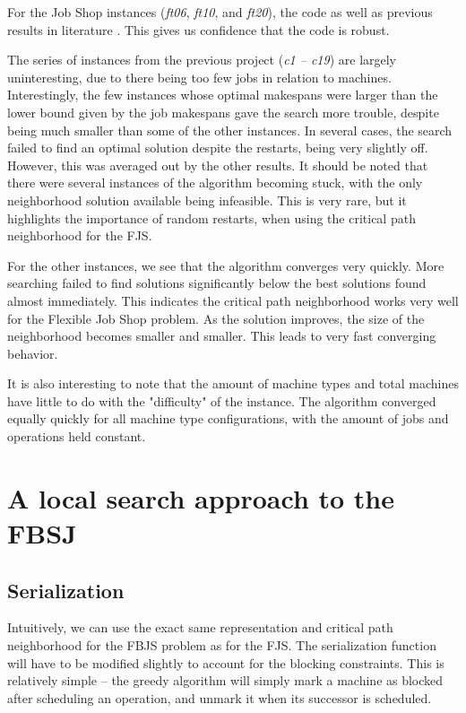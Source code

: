 \documentclass[a4paper,10pt]{article}
\begin{document}
For the Job Shop instances (\emph{ft06}, \emph{ft10}, and \emph{ft20}), the code as well as previous results in literature \cite{simulatedannealingjsp}. This gives us confidence that the code is robust.

The series of instances from the previous project (\emph{c1 -- c19}) are largely uninteresting, due to there being too few jobs in relation to machines. Interestingly, the few instances whose optimal makespans were larger than the lower bound given by the job makespans gave the search more trouble, despite being much smaller than some of the other instances. In several cases, the search failed to find an optimal solution despite the restarts, being very slightly off. However, this was averaged out by the other results. It should be noted that there were several instances of the algorithm becoming stuck, with the only neighborhood solution available being infeasible. This is very rare, but it highlights the importance of random restarts, when using the critical path neighborhood for the FJS.

For the other instances, we see that the algorithm converges very quickly. More searching failed to find solutions significantly below the best solutions found almost immediately. This indicates the critical path neighborhood works very well for the Flexible Job Shop problem. As the solution improves, the size of the neighborhood becomes smaller and smaller. This leads to very fast converging behavior.

It is also interesting to note that the amount of machine types and total machines have little to do with the "difficulty" of the instance. The algorithm converged equally quickly for all machine type configurations, with the amount of jobs and operations held constant.

\section{A local search approach to the FBSJ}

\subsection{Serialization}

Intuitively, we can use the exact same representation and critical path neighborhood for the FBJS problem as for the FJS. The serialization function will have to be modified slightly to account for the blocking constraints. This is relatively simple -- the greedy algorithm will simply mark a machine as blocked after scheduling an operation, and unmark it when its successor is scheduled.
\end{document}
